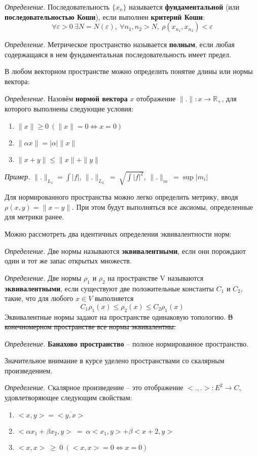 \documentclass[12pt]{article}
\newcommand{\example}{{\itshape Пример. }}
\newcommand{\equals}{\Leftrightarrow}
\newcommand{\defi}{{\itshape Определение. }}
\renewcommand{\leq}{\leqslant}
\renewcommand{\geq}{\geqslant}
\begin{document}
	\defi Последовательность $\{x_n\}$ называется \textbf{фундаментальной} (или \textbf{последовательностью Коши}), если выполнен \textbf{критерий Коши}:
	$$\forall \varepsilon > 0 ~\exists N = N(\varepsilon),~ \forall n_1, n_2 > N,~ \rho(x_{n_1}, x_{n_2}) < \varepsilon$$

	\defi Метрическое пространство называется \textbf{полным}, если любая содержащаяся в нем фундаментальная последовательность имеет предел.
	
	В любом векторном пространстве можно определить понятие длины или нормы вектора:
	
	\defi Назовём \textbf{нормой вектора} $x$ отображение $\|.\| : x \rightarrow \mathbb{R_+}$, для которого выполнены следующие условия:
	\begin{enumerate}
		\item $\|x\| \geq 0 ~(\|x\| = 0 \equals x = 0)$
		\item $\|\alpha x\| = |\alpha| \|x\|$
		\item $\|x + y\| \leq \|x\| + \|y\|$
	\end{enumerate}
	
	\example $\|.\|_{L_1} = \int {|f|}$, $\|.\|_{L_2} ~=~ \sqrt{\int {|f|^2}}$,  $\|.\|_{m} ~= \sup {|m_i|}$
	
	Для нормированного пространства можно легко определить метрику, вводя $\rho(x,y) = \|x-y\|$. При этом будут выполняться все аксиомы,
	определенные для метрики ранее.
	
	Можно рассмотреть два идентичных определения эквивалентности норм:
	
	\defi Две нормы называются \textbf{эквивалентными}, если они порождают один и тот же запас открытых множеств.
	
	\defi Две нормы $\rho_1$ и $\rho_2$ на пространстве V называются \textbf{эквивалентными}, если существуют две положительные константы 
	$C_1$ и $C_2$, такие, что для любого $x \in V$ выполняется 
	$$C_1 \rho_1(x) \leq \rho_2(x) \leq C_2 \rho_1(x)$$
	Эквивалентные нормы задают на пространстве одинаковую топологию. \sout{В конечномерном пространстве все нормы эквивалентны.}
	
	\defi \textbf{Банахово пространство} -- полное нормированное пространство.

	Значительное внимание в курсе уделено пространствами со скалярным произведением.

	\defi Cкалярное произведение -- это отображение $<.,.> : E^2 \rightarrow C$, удовлетворяющее следующим свойствам:
	\begin{enumerate} 
		\item $<x,y> = \overline{<y,x>}$
		\item $<\alpha x_1 + \beta x_2, y> ~= ~\alpha <x_1, y> + \beta <x+2, y>$
		\item $<x, x> ~\geq ~0 ~(<x, x> = 0 \equals x = 0)$
	\end{enumerate}
\end{document}
